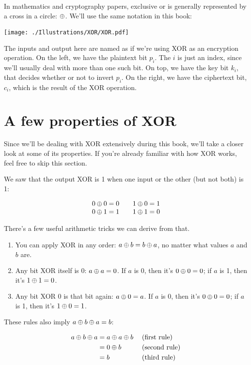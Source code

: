 \documentclass[11pt,ebook,table,dvipsnames]{memoir}
\begin{document}
In mathematics and cryptography papers, exclusive or is generally
represented by a cross in a circle: $\oplus$. We'll use the same
notation in this book:

\texttt{[image: ./Illustrations/XOR/XOR.pdf]}

The inputs and output here are named as if we're using XOR as an
encryption operation. On the left, we have the plaintext bit $p_i$.
The $i$ is just an index, since we'll usually deal with more than one
such bit. On top, we have the key bit $k_i$, that decides whether or
not to invert $p_i$. On the right, we have the ciphertext bit, $c_i$,
which is the result of the XOR operation.
\section{A few properties of XOR}
\label{sec-2-1-2}

Since we'll be dealing with XOR extensively during this book, we'll
take a closer look at some of its properties. If you're already
familiar with how XOR works, feel free to skip this section.

We saw that the output XOR is 1 when one input or the other (but not
both) is 1:

\[
\begin{array}{c@{\hspace{2em}}c}
0 \xor 0 = 0 & 1 \xor 0 = 1 \\
0 \xor 1 = 1 & 1 \xor 1 = 0
\end{array}
\]

There's a few useful arithmetic tricks we can derive from that.

\begin{enumerate}
\item You can apply XOR in any order: $a \oplus b = b \oplus a$, no matter
what values $a$ and $b$ are.
\item Any bit XOR itself is 0: $a \oplus a = 0$. If $a$ is 0, then it's $0
   \oplus 0 = 0$; if $a$ is 1, then it's $1 \oplus 1 = 0$.
\item Any bit XOR 0 is that bit again: $a \oplus 0 = a$. If $a$ is 0, then
it's $0 \oplus 0 = 0$; if $a$ is 1, then it's $1 \oplus 0 = 1$.
\end{enumerate}

These rules also imply $a \oplus b \oplus a = b$:

\begin{align*}
a \oplus b \oplus a & = a \oplus a \oplus b & \; & \text{(first rule)} \\
                & = 0 \oplus b        & \; & \text{(second rule)} \\
                & = b               & \; & \text{(third rule)}
\end{align*}
\end{document}
